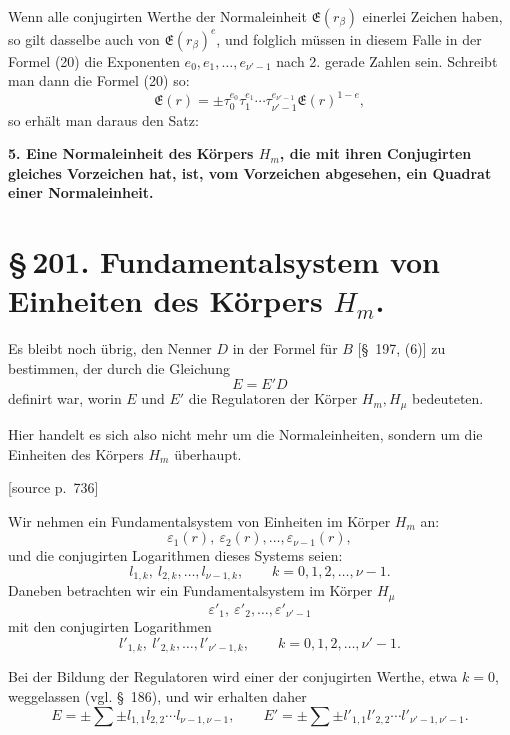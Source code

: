\documentclass[11pt]{article}
\newcommand{\srcpage}[1]{\par\medskip\noindent\textsf{[source p.~#1]}\par\smallskip}
\begin{document}
Wenn alle conjugirten Werthe der Normaleinheit $\mathfrak E(r_\beta)$ einerlei Zeichen haben, so gilt dasselbe auch von $\mathfrak E(r_\beta)^e$, und folglich müssen in diesem Falle in der Formel (20) die Exponenten $e_0,e_1,\ldots,e_{\nu'-1}$ nach 2. gerade Zahlen sein. Schreibt man dann die Formel (20) so:
\[
\mathfrak E(r)=\pm\tau_0^{e_0}\tau_1^{e_1}\cdots\tau_{\nu'-1}^{e_{\nu'-1}}\mathfrak E(r)^{1-e},
\]
so erhält man daraus den Satz:

\begin{center}\textbf{5. Eine Normaleinheit des Körpers $H_m$, die mit ihren Conjugirten gleiches Vorzeichen hat, ist, vom Vorzeichen abgesehen, ein Quadrat einer Normaleinheit.}\end{center}

\section*{\S\,201. Fundamentalsystem von Einheiten des Körpers $H_m$.}

Es bleibt noch übrig, den Nenner $D$ in der Formel für $B$ [\S~197, (6)] zu bestimmen, der durch die Gleichung
\[
E=E'D
\]
definirt war, worin $E$ und $E'$ die Regulatoren der Körper $H_m,H_\mu$ bedeuteten.

Hier handelt es sich also nicht mehr um die Normaleinheiten, sondern um die Einheiten des Körpers $H_m$ überhaupt.

\srcpage{736}
Wir nehmen ein Fundamentalsystem von Einheiten im Körper $H_m$ an:
\begin{equation}
\varepsilon_1(r),\ \varepsilon_2(r),\ldots,\varepsilon_{\nu-1}(r),
\tag{1}
\end{equation}
und die conjugirten Logarithmen dieses Systems seien:
\begin{equation}
l_{1,k},\ l_{2,k},\ldots,l_{\nu-1,k},\qquad k=0,1,2,\ldots,\nu-1.
\tag{2}
\end{equation}
Daneben betrachten wir ein Fundamentalsystem im Körper $H_\mu$
\begin{equation}
\varepsilon'_1,\ \varepsilon'_2,\ldots,\varepsilon'_{\nu'-1}
\tag{3}
\end{equation}
mit den conjugirten Logarithmen
\begin{equation}
l'_{1,k},\ l'_{2,k},\ldots,l'_{\nu'-1,k},\qquad k=0,1,2,\ldots,\nu'-1.
\tag{4}
\end{equation}

Bei der Bildung der Regulatoren wird einer der conjugirten Werthe, etwa $k=0$, weggelassen (vgl. \S~186), und wir erhalten daher
\begin{equation}
E=\pm\sum\pm l_{1,1}l_{2,2}\cdots l_{\nu-1,\nu-1},
\qquad
E'=\pm\sum\pm l'_{1,1}l'_{2,2}\cdots l'_{\nu'-1,\nu'-1}.
\tag{5}
\end{equation}
\end{document}
